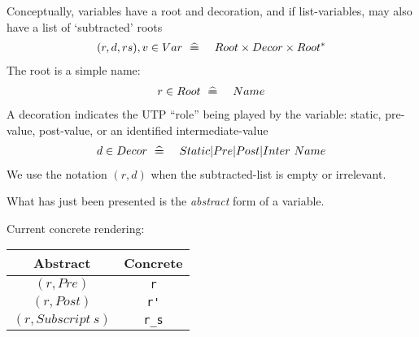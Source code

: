 Conceptually,
variables have a root and decoration,
and if list-variables, may also have a list of `subtracted' roots
\begin{eqnarray*}
  (r,d,rs),v \in Var &\mathrel{~\widehat{=\!\!\!\!=}}~& Root \times Decor \times Root^*
\end{eqnarray*}
The root is a simple name:
\begin{eqnarray*}
  r \in Root &\mathrel{~\widehat{=\!\!\!\!=}}~& Name
\end{eqnarray*}
A decoration indicates the UTP ``role'' being played by the variable:
 static, pre-value, post-value, or an identified intermediate-value
\begin{eqnarray*}
  d \in Decor &\mathrel{~\widehat{=\!\!\!\!=}}~&  Static | Pre | Post | Inter~Name
\end{eqnarray*}
We use the notation $(r,d)$ when the subtracted-list is empty or irrelevant.

What has just been presented is the \emph{abstract} form of a variable.

Current concrete rendering:

\begin{tabular}{|c|c|}
  \hline
  Abstract & Concrete
  \\ \hline
  $(r,Pre)$ & \verb"r"
  \\ \hline
  $(r,Post)$ & \verb"r'"
  \\ \hline
  $(r,Subscript~s)$ & \verb"r_s"
  \\ \hline
\end{tabular}
